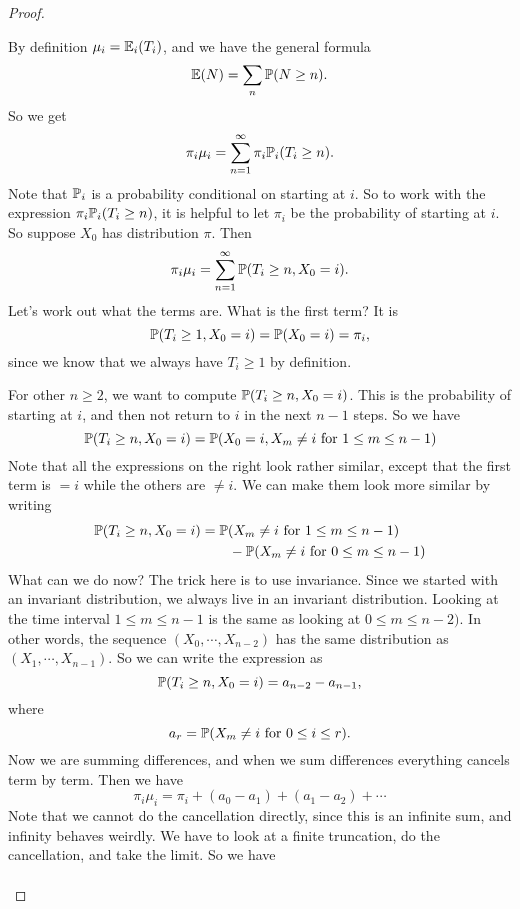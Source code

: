 \documentclass[a4paper]{article}
\begin{document}
\begin{proof}
\begin{enumerate}
      By definition $\mu_i = \E_i(T_i)$, and we have the general formula
      \[
        \E(N) = \sum_n \P(N \geq n).
      \]
      So we get
      \[
        \pi_i \mu_i = \sum_{n = 1}^\infty \pi_i\P_i (T_i \geq n).
      \]
      Note that $\P_i$ is a probability conditional on starting at $i$. So to work with the expression $\pi_i \P_i (T_i \geq n)$, it is helpful to let $\pi_i$ be the probability of starting at $i$. So suppose $X_0$ has distribution $\pi$. Then
      \[
        \pi_i \mu_i = \sum_{n = 1}^\infty \P(T_i \geq n, X_0 = i).
      \]
      Let's work out what the terms are. What is the first term? It is
      \[
        \P(T_i \geq 1, X_0 = i) = \P(X_0 = i) = \pi_i,
      \]
      since we know that we always have $T_i \geq 1$ by definition.

      For other $n \geq 2$, we want to compute $\P(T_i \geq n, X_0 = i)$. This is the probability of starting at $i$, and then not return to $i$ in the next $n - 1$ steps. So we have
      \[
        \P(T_i \geq n, X_0 = i) = \P(X_0 = i, X_m \not= i\text{ for } 1 \leq m \leq n - 1)
      \]
      Note that all the expressions on the right look rather similar, except that the first term is $=i$ while the others are $\not= i$. We can make them look more similar by writing
      \begin{align*}
        \P(T_i \geq n, X_0 = i) &= \P(X_m \not= i\text{ for } 1\leq m \leq n - 1) \\
        &\quad\quad- \P(X_m \not= i\text{ for } 0\leq m \leq n - 1)
      \end{align*}
      What can we do now? The trick here is to use invariance. Since we started with an invariant distribution, we always live in an invariant distribution. Looking at the time interval $1 \leq m \leq n -1$ is the same as looking at $0 \leq m \leq n -2)$. In other words, the sequence $(X_0, \cdots, X_{n - 2})$ has the same distribution as $(X_1, \cdots, X_{n - 1})$. So we can write the expression as
      \[
        \P(T_i \geq n, X_0 = i) = a_{n - 2} - a_{n - 1},
      \]
      where
      \[
        a_r = \P(X_m \not= i \text{ for }0 \leq i \leq r).
      \]
      Now we are summing differences, and when we sum differences everything cancels term by term. Then we have
      \[
        \pi_i \mu_i = \pi_i + (a_0 - a_1) + (a_1 - a_2) + \cdots
      \]
      Note that we cannot do the cancellation directly, since this is an infinite sum, and infinity behaves weirdly. We have to look at a finite truncation, do the cancellation, and take the limit. So we have
      \begin{align*}

\end{align*}
\end{enumerate}
\end{proof}
\end{document}
